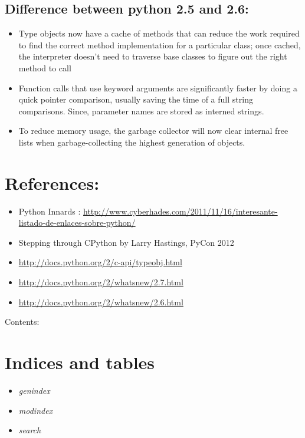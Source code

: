 \documentclass[letterpaper,10pt,dutch]{sphinxmanual}
\begin{document}
\section{Difference between python 2.5 and 2.6:}
\label{index:difference-between-python-2-5-and-2-6}\begin{itemize}
\item {} 
Type objects now have a cache of methods that can reduce the work required to find the correct method implementation for a particular class; once cached, the interpreter doesn’t need to traverse base classes to figure out the right method to call

\item {} 
Function calls that use keyword arguments are significantly faster by doing a quick pointer comparison, usually saving the time of a full string comparisons. Since, parameter names are stored as interned strings.

\item {} 
To reduce memory usage, the garbage collector will now clear internal free lists when garbage-collecting the highest generation of objects.

\end{itemize}


\chapter{References:}
\label{index:references}\begin{itemize}
\item {} 
Python Innards : \href{http://www.cyberhades.com/2011/11/16/interesante-listado-de-enlaces-sobre-python/}{http://www.cyberhades.com/2011/11/16/interesante-listado-de-enlaces-sobre-python/}

\item {} 
Stepping through CPython by Larry Hastings, PyCon 2012

\item {} 
\href{http://docs.python.org/2/c-api/typeobj.html}{http://docs.python.org/2/c-api/typeobj.html}

\item {} 
\href{http://docs.python.org/2/whatsnew/2.7.html}{http://docs.python.org/2/whatsnew/2.7.html}

\item {} 
\href{http://docs.python.org/2/whatsnew/2.6.html}{http://docs.python.org/2/whatsnew/2.6.html}

\end{itemize}

Contents:


\chapter{Indices and tables}
\label{index:indices-and-tables}\begin{itemize}
\item {} 
\emph{genindex}

\item {} 
\emph{modindex}

\item {} 
\emph{search}

\end{itemize}



\renewcommand{\indexname}{Index}
\printindex
\end{document}
